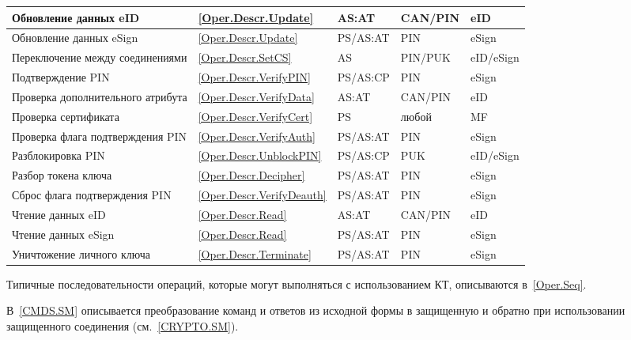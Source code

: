 \begin{table}[p]
\begin{tabular}{|p{7.5cm}|p{1.3cm}|p{2.6cm}|p{1.8cm}| p{1.7cm}|}
\hline
Обновление данных eID & \ref{Oper.Descr.Update} & AS:AT & CAN/PIN & eID \\
\hline
Обновление данных eSign & \ref{Oper.Descr.Update} & PS/AS:AT & PIN & eSign \\
\hline
Переключение между соединениями & \ref{Oper.Descr.SetCS} & AS & PIN/PUK & 
eID/eSign \\ 
\hline
Подтверждение PIN & \ref{Oper.Descr.VerifyPIN} & PS/AS:CP & PIN & eSign \\
\hline
Проверка дополнительного атрибута& \ref{Oper.Descr.VerifyData}& AS:AT & CAN/PIN 
& eID \\ 
\hline
Проверка сертификата & \ref{Oper.Descr.VerifyCert} & PS & любой & MF \\
\hline
Проверка флага подтверждения PIN & \ref{Oper.Descr.VerifyAuth} & PS/AS:AT & PIN 
& eSign \\ 
\hline
Разблокировка PIN & \ref{Oper.Descr.UnblockPIN} & PS/AS:CP  & PUK & eID/eSign\\ 
\hline
Разбор токена ключа & 
\ref{Oper.Descr.Decipher} & PS/AS:AT & PIN & eSign \\
\hline
Сброс флага подтверждения PIN & \ref{Oper.Descr.VerifyDeauth} & 
PS/AS:AT  & PIN & eSign \\ 
\hline
Чтение данных eID & \ref{Oper.Descr.Read} & AS:AT & CAN/PIN & eID \\
\hline
Чтение данных eSign & \ref{Oper.Descr.Read} & PS/AS:AT& PIN & eSign \\
\hline
Уничтожение личного ключа & \ref{Oper.Descr.Terminate} & PS/AS:AT  & PIN & eSign \\
\hline
\end{tabular}
\end{table}

Типичные последовательности операций, которые могут выполняться 
с использованием КТ, описываются в~\ref{Oper.Seq}.

В~\ref{CMDS.SM} описывается преобразование команд и ответов из исходной формы в 
защищенную и обратно при использовании защищенного соединения (см.~\ref{CRYPTO.SM}). 


